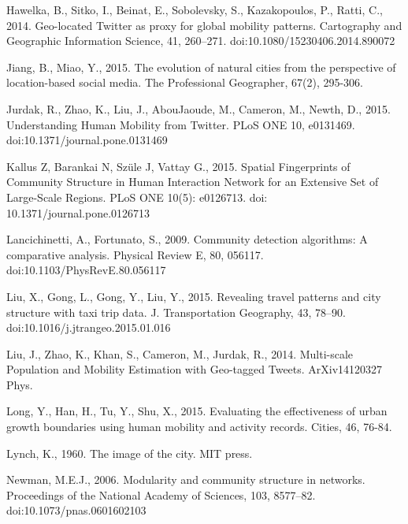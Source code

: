 \documentclass[]{tGIS2e}
\begin{document}
\begin{thebibliography}{9}
Hawelka, B., Sitko, I., Beinat, E., Sobolevsky, S., Kazakopoulos, P., Ratti, C., 2014. Geo-located Twitter as proxy for global mobility patterns. Cartography and Geographic Information Science, 41, 260–271. doi:10.1080/15230406.2014.890072

Jiang, B., Miao, Y., 2015. The evolution of natural cities from the perspective of location-based social media. The Professional Geographer, 67(2), 295-306.

Jurdak, R., Zhao, K., Liu, J., AbouJaoude, M., Cameron, M., Newth, D., 2015. Understanding Human Mobility from Twitter. PLoS ONE 10, e0131469. doi:10.1371/journal.pone.0131469

Kallus Z, Barankai N, Szüle J, Vattay G., 2015. Spatial Fingerprints of Community Structure in Human Interaction Network for an Extensive Set of Large-Scale Regions. PLoS ONE 10(5): e0126713. doi: 10.1371/journal.pone.0126713 

Lancichinetti, A., Fortunato, S., 2009. Community detection algorithms: A comparative analysis. Physical Review E, 80, 056117. doi:10.1103/PhysRevE.80.056117


Liu, X., Gong, L., Gong, Y., Liu, Y., 2015. Revealing travel patterns and city structure with taxi trip data. J. Transportation Geography, 43, 78–90. doi:10.1016/j.jtrangeo.2015.01.016

Liu, J., Zhao, K., Khan, S., Cameron, M., Jurdak, R., 2014. Multi-scale Population and Mobility Estimation with Geo-tagged Tweets. ArXiv14120327 Phys.


Long, Y., Han, H., Tu, Y., Shu, X., 2015. Evaluating the effectiveness of urban growth boundaries using human mobility and activity records. Cities, 46, 76-84.

Lynch, K., 1960. The image of the city. MIT press.

Newman, M.E.J., 2006. Modularity and community structure in networks. Proceedings of the National Academy of Sciences, 103, 8577–82. doi:10.1073/pnas.0601602103


\end{thebibliography}
\end{document}
